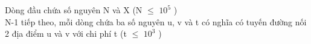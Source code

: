 Dòng đầu chứa số nguyên N và X (N  $\le$  $10^{5}$ )
\\N-1 tiếp theo, mỗi dòng chứa ba số nguyên u, v và t có nghĩa có tuyến đường nối 2 địa điểm u và v với chi phí t (t  $\le$  $10^{3}$ )
\\ 